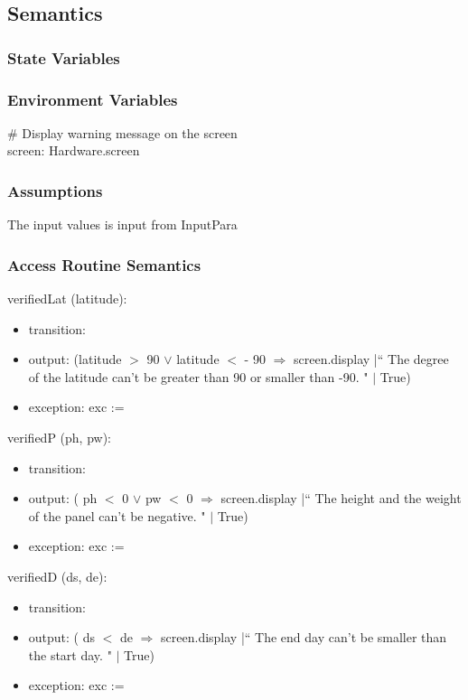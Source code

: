 \documentclass[12pt, titlepage]{article}
\begin{document}

\subsection{Semantics}

\subsubsection{State Variables}



\subsubsection{Environment Variables}
\# Display warning message on the screen\\
screen: Hardware.screen\\

\subsubsection{Assumptions}
The input values is input from InputPara


\subsubsection{ Access Routine Semantics}

\noindent  verifiedLat (latitude):
\begin{itemize}
\item transition: 
\item output: (latitude $>$ 90 $\lor$ latitude $<$ - 90 $\Rightarrow$ screen.display |`` The degree of the latitude can't be greater than 90 or smaller than -90. " $|$ True)
\item exception: exc := 
\end{itemize}

\noindent  verifiedP (ph, pw):
\begin{itemize}
\item transition: 
\item output: ( ph $<$ 0 $\lor$ pw $<$ 0 $\Rightarrow$ screen.display |`` The height and the weight of the panel can't be negative. " $|$ True)
\item exception: exc := 
\end{itemize}

\noindent  verifiedD (ds, de):
\begin{itemize}
\item transition: 
\item output: ( ds $<$ de $\Rightarrow$ screen.display |`` The end day can't be smaller than the start day. " $|$ True)
\item exception: exc := 
\end{itemize}
\end{document}
